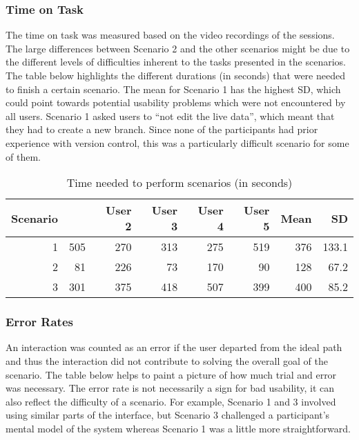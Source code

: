\subsubsection{Time on Task}
The time on task was measured based on the video recordings of the sessions. The large differences between Scenario 2 and the other scenarios might be due to the different levels of difficulties inherent to the tasks presented in the scenarios. The table below highlights the different durations (in seconds) that were needed to finish a certain scenario. The mean for Scenario 1 has the highest \ac{SD}, which could point towards potential usability problems which were not encountered by all users. Scenario 1 asked users to “not edit the live data”, which meant that they had to create a new branch. Since none of the participants had prior experience with version control, this was a particularly difficult scenario for some of them.

\begin{table}[h!]
\begin{tabular}{|r|r|r|r|r|r|r|r|}
\hline
\rowcolor[HTML]{EFEFEF}
{\bf Scenario} & \multicolumn{1}{c|}{\cellcolor[HTML]{EFEFEF}{\bf User 1}} & {\bf User 2} & {\bf User 3} & {\bf User 4} & {\bf User 5} & {\bf Mean} & {\bf SD} \\ \hline
\cellcolor[HTML]{EFEFEF} 1 & 505 & 270 & 313 & 275 & 519 & 376 & 133.1 \\ \hline
\cellcolor[HTML]{EFEFEF} 2 & 81 & 226 & 73 & 170 & 90 & 128 & 67.2 \\ \hline
\cellcolor[HTML]{EFEFEF} 3 & 301 & 375 & 418 & 507 & 399 & 400 & 85.2      \\ \hline
\end{tabular}
\centering
\caption{Time needed to perform scenarios (in seconds)}
\label{table:time-on-tasks}
\end{table}

\subsubsection{Error Rates}
An interaction was counted as an error if the user departed from the ideal path and thus the interaction did not contribute to solving the overall goal of the scenario. The table below helps to paint a picture of how much trial and error was necessary. The error rate is not necessarily a sign for bad usability, it can also reflect the difficulty of a scenario. For example, Scenario 1 and 3 involved using similar parts of the interface, but Scenario 3 challenged a participant's mental model of the system whereas Scenario 1 was a little more straightforward.

